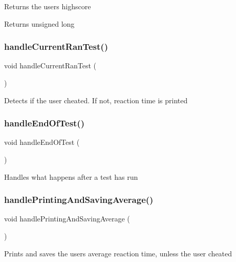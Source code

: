 Returns the user\textquotesingle{}s highscore \begin{DoxyReturn}{Returns}
unsigned long 
\end{DoxyReturn}
\mbox{\label{test_8ino_a88a2b207186d3402859a88394a1b0a76}} 
\subsubsection{\texorpdfstring{handleCurrentRanTest()}{handleCurrentRanTest()}}
{\footnotesize\ttfamily void handle\+Current\+Ran\+Test (\begin{DoxyParamCaption}{ }\end{DoxyParamCaption})}

Detects if the user cheated. If not, reaction time is printed \mbox{\label{test_8ino_a9849dea51c0097aff1bc18f7f089ecc2}} 
\subsubsection{\texorpdfstring{handleEndOfTest()}{handleEndOfTest()}}
{\footnotesize\ttfamily void handle\+End\+Of\+Test (\begin{DoxyParamCaption}{ }\end{DoxyParamCaption})}

Handles what happens after a test has run \mbox{\label{test_8ino_a6b058d40feb0a038c46ec9e52b9cdc76}} 
\subsubsection{\texorpdfstring{handlePrintingAndSavingAverage()}{handlePrintingAndSavingAverage()}}
{\footnotesize\ttfamily void handle\+Printing\+And\+Saving\+Average (\begin{DoxyParamCaption}{ }\end{DoxyParamCaption})}

Prints and saves the user\textquotesingle{}s average reaction time, unless the user cheated \mbox{\label{test_8ino_a4240c872c1f2907aac992663ccc5666d}} 
